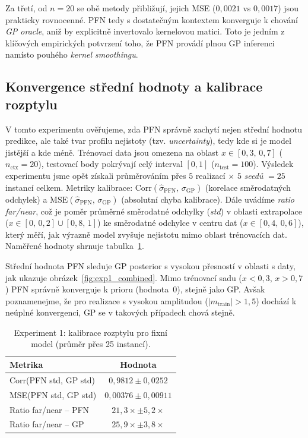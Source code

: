 Za třetí, od $n = 20$ se obě metody přibližují, jejich MSE ($0{,}0021$ vs $0{,}0017$) jsou prakticky rovnocenné.
PFN tedy s dostatečným kontextem konverguje k chování \emph{GP oracle}, aniž by explicitně invertovalo kernelovou matici.
Toto je jedním z klíčových empirických potvrzení toho, že PFN provádí plnou GP inferenci namísto pouhého \emph{kernel smoothingu}.

\subsection{Konvergence střední hodnoty a kalibrace rozptylu}
\label{subsec:konvergence-variance}

V tomto experimentu ověřujeme, zda PFN správně zachytí nejen střední hodnotu predikce, ale také tvar profilu nejistoty (tzv. \emph{uncertainty}), tedy kde si je model jistější a kde méně.
Trénovací data jsou omezena na oblast $x \in [0{,}3,\, 0{,}7]$ ($n_{\text{ctx}} = 20$), testovací body pokrývají celý interval $[0, 1]$ ($n_{\text{test}} = 100$).
Výsledek experimentu jsme opět získali průměrováním přes $5$ realizací $\times$ $5$ \emph{seedů} $= 25$ instancí celkem.
Metriky kalibrace: $\text{Corr}(\hat{\sigma}_{\text{PFN}},\, \sigma_{\text{GP}})$ (korelace směrodatných odchylek) a $\text{MSE}(\hat{\sigma}_{\text{PFN}},\, \sigma_{\text{GP}})$ (absolutní chyba kalibrace).
Dále uvádíme \textit{ratio far/near}, což je poměr průměrné směrodatné odchylky (\emph{std}) v oblasti extrapolace ($x \in [0,\, 0{,}2] \cup [0{,}8,\, 1]$) ke směrodatné odchylce v centru dat ($x \in [0{,}4,\, 0{,}6]$), který měří, jak výrazně model zvyšuje nejistotu mimo oblast trénovacích dat.
Naměřené hodnoty shrnuje tabulka~\ref{tab:exp1}.
\par

Střední hodnota PFN sleduje GP posterior s vysokou přesností v oblasti s daty, jak ukazuje obrázek~\ref{fig:exp1_combined}.
Mimo trénovací sadu ($x < 0{,}3$, $x > 0{,}7$) PFN správně konverguje k prioru (hodnota~$0$), stejně jako GP.
Avšak poznamenejme, že pro realizace s vysokou amplitudou ($|m_{\text{train}}| > 1{,}5$) dochází k neúplné konvergenci, GP se v takových případech chová stejně.

\begin{table}[htbp]
\centering
\begin{tabular}{lc}
\hline
Metrika & Hodnota \\
\hline
Corr(PFN std, GP std) & $0{,}9812 \pm 0{,}0252$ \\
MSE(PFN std, GP std) & $0{,}00376 \pm 0{,}00911$ \\
Ratio far/near – PFN & $21{,}3\times \pm 5{,}2\times$ \\
Ratio far/near – GP  & $25{,}9\times \pm 3{,}8\times$ \\
\hline
\end{tabular}
\caption{Experiment 1: kalibrace rozptylu pro fixní model (průměr přes 25 instancí).}
\label{tab:exp1}
\end{table}

